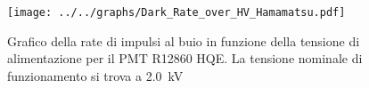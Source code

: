 \begin{figure}[h] \centering \texttt{[image: ../../graphs/Dark\_Rate\_over\_HV\_Hamamatsu.pdf]}\caption{Grafico della rate di impulsi al buio in funzione della tensione di alimentazione per il PMT R12860 HQE. La tensione nominale di funzionamento si trova a \SI{2.0}{\kilo\volt}}\label{gr:Dark_Rate_over_HV_Hamamatsu} \end{figure}
